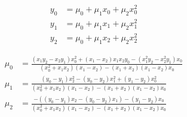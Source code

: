 \begin{align}
  y_0 & = \mu_0+\mu_1 x_0+\mu_2 x_0^{2}  \\
   y_1 & = \mu_0+\mu_1 x_1+\mu_2 x_1^{2}  \\
   y_2 & = \mu_0+\mu_1 x_2+\mu_2 x_2^{2}  
\end{align}

 
\begin{align}
  \mu_0 & = \frac
{ \left( x_1 y_2 - x_2 y_1 \right)  x_0^{2}+ \left( x_1 - x_2 \right)  x_1 x_2 y_0 -   \left( x_1^{2} y_2 - x_2^{2} y_1 \right)  x_0}
{ \left( x_0^{2}+x_1 x_2  \right)   \left( x_1 - x_2 \right)  -  \left( x_1+x_2 \right)   \left( x_1 - x_2 \right)  x_0 } \\
   \mu_1 & = \frac
{ \left( y_0 - y_1 \right)  x_2^{2} -  \left( y_0 - y_2 \right)  x_1^{2}+  \left( y_1 - y_2 \right)  x_0^{2}}
{ \left( x_0^{2}+x_1 x_2 \right)   \left(  x_1 - x_2 \right)  -  \left( x_1+x_2 \right)   \left( x_1 - x_2 \right)  x_0} \\
   \mu_2 & = \frac
{  -  \left(  \left( y_0 - y_1 \right)  x_2 -  \left( y_0 - y_2 \right)  x_1 \right)  -  \left( y_1 - y_2  \right)  x_0}
{ \left( x_0^{2}+x_1 x_2 \right)   \left( x_1 - x_2 \right)  -   \left( x_1+x_2 \right)   \left( x_1 - x_2 \right)  x_0} 
\end{align}
